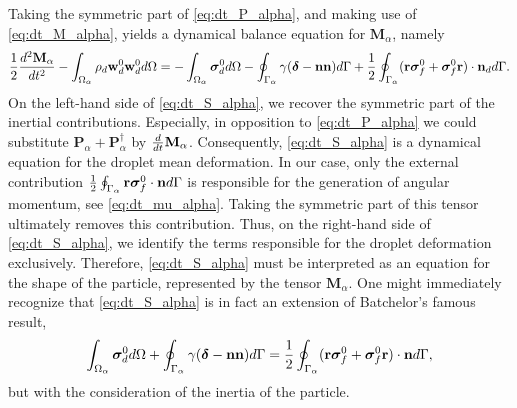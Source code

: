Taking the symmetric part of \ref{eq:dt_P_alpha}, and making use of \ref{eq:dt_M_alpha}, yields a dynamical balance equation for $\textbf{M}_\alpha$, namely
\begin{equation}    
    \frac{1}{2}\frac{d^2 \textbf{M}_\alpha}{dt^2}
    - \int_{\Omega_{\alpha}}  \rho_d  \textbf{w}_d^0 \textbf{w}_d^0  d\Omega
    = 
    - \int_{\Omega_{\alpha}} \bm{\sigma}_d^0 d\Omega
    - \oint_{\Gamma_{\alpha}} \gamma (\bm\delta - \textbf{nn}) d\Gamma
    + \frac{1}{2}\oint_{\Gamma_{\alpha}} (\textbf{r}\bm{\sigma}_f^0+\bm{\sigma}_f^0 \textbf{r})\cdot \textbf{n}_d d\Gamma.
    \label{eq:dt_S_alpha}
\end{equation}
On the left-hand side of \ref{eq:dt_S_alpha}, we recover the symmetric part of the inertial contributions. 
Especially, in opposition to \ref{eq:dt_P_alpha} we could substitute $\textbf{P}_\alpha+\textbf{P}_\alpha^\dagger$ by $\frac{d}{dt} \textbf{M}_\alpha$. 
Consequently, \ref{eq:dt_S_alpha} is a dynamical equation for the droplet mean deformation. 
In our case, only the external contribution $\frac{1}{2}\oint_{\Gamma_{\alpha}} \textbf{r}\bm\sigma_f^0\cdot \textbf{n} d\Gamma$ is responsible for the generation of angular momentum, see \ref{eq:dt_mu_alpha}.
Taking the symmetric part of this tensor ultimately removes this contribution. 
Thus, on the right-hand side of \ref{eq:dt_S_alpha}, we identify the terms responsible for the droplet deformation exclusively.
Therefore, \ref{eq:dt_S_alpha} must be interpreted as an equation for the shape of the particle, represented by the tensor $\textbf{M}_\alpha$.
One might immediately recognize that \ref{eq:dt_S_alpha} is in fact an extension of Batchelor’s famous result, 
\begin{equation}
    \int_{\Omega_{\alpha}} \bm{\sigma}_d^0 d\Omega
    + \oint_{\Gamma_{\alpha}} \gamma(\bm\delta - \textbf{nn}) d\Gamma
    = \frac{1}{2}\oint_{\Gamma_{\alpha}} (\textbf{r}\bm\sigma_f^0+\bm\sigma_f^0\textbf{r})\cdot \textbf{n} d\Gamma,
    \label{eq:Batchelor}
\end{equation}
but with the consideration of the inertia of the particle.
